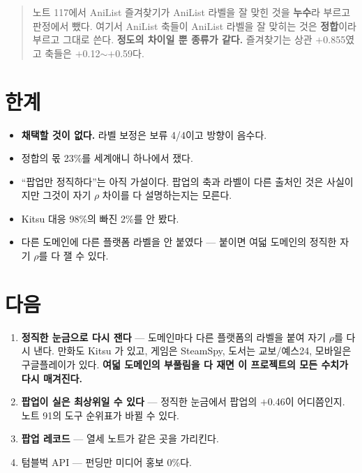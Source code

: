 \documentclass[10pt]{article}
\begin{document}
\begin{quote}\fontsize{9.5}{11.5}\selectfont
노트 117에서 AniList 즐겨찾기가 AniList 라벨을 잘 맞힌 것을 \textbf{누수}라
부르고 판정에서 뺐다. 여기서 AniList 축들이 AniList 라벨을 잘 맞히는 것은
\textbf{정합}이라 부르고 그대로 쓴다. \textbf{정도의 차이일 뿐 종류가 같다.}
즐겨찾기는 상관 $+$0.855였고 축들은 $+$0.12$\sim+$0.59다.
\end{quote}


\section{한계}

\begin{itemize}[leftmargin=1.1em,itemsep=0.15em]
\item \textbf{채택할 것이 없다.} 라벨 보정은 보류 4/4이고 방향이 음수다.
\item 정합의 몫 23\%를 세계애니 하나에서 쟀다.
\item ``팝업만 정직하다''는 아직 가설이다. 팝업의 축과 라벨이 다른 출처인
      것은 사실이지만 그것이 자기 $\rho$ 차이를 다 설명하는지는 모른다.
\item Kitsu 대응 98\%의 빠진 2\%를 안 봤다.
\item 다른 도메인에 다른 플랫폼 라벨을 안 붙였다 --- 붙이면 여덟 도메인의
      정직한 자기 $\rho$를 다 잴 수 있다.
\end{itemize}

\section{다음}

\begin{enumerate}[leftmargin=1.3em,itemsep=0.15em]
\item \textbf{정직한 눈금으로 다시 잰다} --- 도메인마다 다른 플랫폼의 라벨을
      붙여 자기 $\rho$를 다시 낸다. 만화도 Kitsu 가 있고, 게임은 SteamSpy,
      도서는 교보/예스24, 모바일은 구글플레이가 있다. \textbf{여덟 도메인의
      부풀림을 다 재면 이 프로젝트의 모든 수치가 다시 매겨진다.}
\item \textbf{팝업이 실은 최상위일 수 있다} --- 정직한 눈금에서 팝업의
      $+$0.46이 어디쯤인지. 노트 91의 도구 순위표가 바뀔 수 있다.
\item \textbf{팝업 레코드} --- 열세 노트가 같은 곳을 가리킨다.
\item 텀블벅 API --- 펀딩만 미디어 홍보 0\%다.
\end{enumerate}
\end{document}
